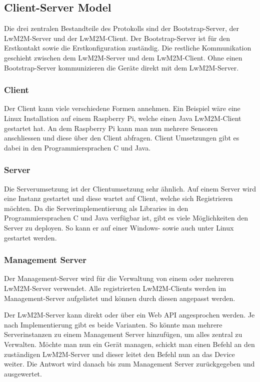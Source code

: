 \newpage

\subsection{Client-Server Model}
Die drei zentralen Bestandteile des Protokolls sind der Bootstrap-Server, der LwM2M-Server und der LwM2M-Client. Der Bootstrap-Server ist für den Erstkontakt sowie die Erstkonfiguration zuständig. Die restliche Kommunikation geschieht zwischen dem LwM2M-Server und dem LwM2M-Client. Ohne einen Bootstrap-Server kommunizieren die Geräte direkt mit dem LwM2M-Server.
\subsubsection{Client}
Der Client kann viele verschiedene Formen annehmen. Ein Beispiel wäre eine Linux Installation auf einem Raspberry Pi, welche einen Java LwM2M-Client gestartet hat. An dem Raspberry Pi kann man nun mehrere Sensoren anschliessen und diese über den Client abfragen. Client Umsetzungen gibt es dabei in den Programmiersprachen C und Java.
\subsubsection{Server}
Die Serverumsetzung ist der Clientumsetzung sehr ähnlich. Auf einem Server wird eine Instanz gestartet und diese wartet auf Client, welche sich Registrieren möchten. Da die Serverimplementierung als Libraries in den Programmiersprachen C und Java verfügbar ist, gibt es viele Möglichkeiten den Server zu deployen. So kann er auf einer Windows- sowie auch unter Linux gestartet werden.
\subsubsection{Management Server}
Der Management-Server wird für die Verwaltung von einem oder mehreren LwM2M-Server verwendet. Alle registrierten LwM2M-Clients werden im Management-Server aufgelistet und können durch diesen angepasst werden.

Der LwM2M-Server kann direkt oder über ein Web API angesprochen werden. Je nach Implementierung gibt es beide Varianten. So könnte man mehrere Serverinstanzen zu einem Management Server hinzufügen, um alles zentral zu Verwalten. Möchte man nun ein Gerät managen, schickt man einen Befehl an den zuständigen LwM2M-Server und dieser leitet den Befehl nun an das Device weiter. Die Antwort wird danach bis zum Management Server zurückgegeben und ausgewertet. 
